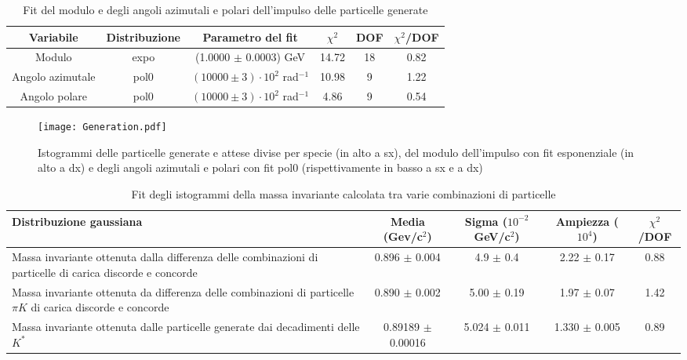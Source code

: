 \documentclass[a4paper,10pt]{article}
\begin{document}
\begin{table}[p]
  \caption{Fit del modulo e degli angoli azimutali e polari dell'impulso delle particelle generate}
  \label{tab:fit}
  \centering
  \begin{tabular}{cccccc}
    \toprule
    Variabile        & Distribuzione & Parametro del fit                     & $\chi^2$ & DOF & $\chi^2$/DOF \\
    \midrule
    Modulo           & expo          & (1.0000 $\pm$ 0.0003) GeV             & 14.72    & 18  & 0.82         \\
    \midrule
    Angolo azimutale & pol0          & $(10000 \pm 3) \cdot 10^2$ rad$^{-1}$ & 10.98    & 9   & 1.22         \\
    Angolo polare    & pol0          & $(10000 \pm 3) \cdot 10^2$ rad$^{-1}$ & 4.86     & 9   & 0.54         \\
    \bottomrule
  \end{tabular}
\end{table}

\begin{figure*}[p]
  \centering
  \texttt{[image: Generation.pdf]}
  \caption{Istogrammi delle particelle generate e attese divise per specie (in alto a sx), del modulo dell'impulso con fit esponenziale (in alto a dx) e degli angoli azimutali e polari con fit pol0 (rispettivamente in basso a sx e a dx)}
  \label{fig:Generation}
\end{figure*}

\begin{table*}
  \caption{Fit degli istogrammi della massa invariante calcolata tra varie combinazioni di particelle}
  \label{tab:fitgaus}
  \centering
  \begin{tabular}{p{4.5cm}cccc}
    \toprule
    Distribuzione gaussiana                                                                                        & Media (Gev/c$^2$)     & Sigma ($10^{-2}$ GeV/c$^2$) & Ampiezza ($10^4$) & $\chi^2$/DOF \\
    \midrule
    Massa invariante ottenuta dalla differenza delle combinazioni di particelle di carica discorde e concorde      & 0.896 $\pm$ 0.004     & 4.9 $\pm$ 0.4               & 2.22 $\pm$ 0.17   & 0.88         \\
    \midrule
    Massa invariante ottenuta da differenza delle combinazioni di particelle $\pi K$ di carica discorde e concorde & 0.890 $\pm$ 0.002     & 5.00 $\pm$ 0.19             & 1.97 $\pm$ 0.07   & 1.42         \\
    \midrule
    Massa invariante ottenuta dalle particelle generate dai decadimenti delle $K^*$                                & 0.89189 $\pm$ 0.00016 & 5.024 $\pm$ 0.011           & 1.330 $\pm$ 0.005 & 0.89         \\
    \bottomrule
  \end{tabular}
\end{table*}
\end{document}
